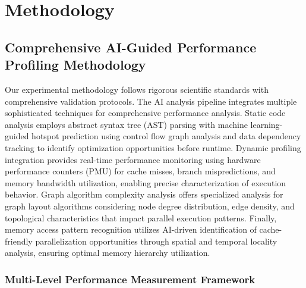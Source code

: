 
\section{Methodology}
\label{sec:methodology}


\subsection{Comprehensive AI-Guided Performance Profiling Methodology}

Our experimental methodology follows rigorous scientific standards with comprehensive validation protocols. The AI analysis pipeline integrates multiple sophisticated techniques for comprehensive performance analysis. Static code analysis employs abstract syntax tree (AST) parsing with machine learning-guided hotspot prediction using control flow graph analysis and data dependency tracking to identify optimization opportunities before runtime. Dynamic profiling integration provides real-time performance monitoring using hardware performance counters (PMU) for cache misses, branch mispredictions, and memory bandwidth utilization, enabling precise characterization of execution behavior. Graph algorithm complexity analysis offers specialized analysis for graph layout algorithms considering node degree distribution, edge density, and topological characteristics that impact parallel execution patterns. Finally, memory access pattern recognition utilizes AI-driven identification of cache-friendly parallelization opportunities through spatial and temporal locality analysis, ensuring optimal memory hierarchy utilization.

\subsubsection{Multi-Level Performance Measurement Framework}

